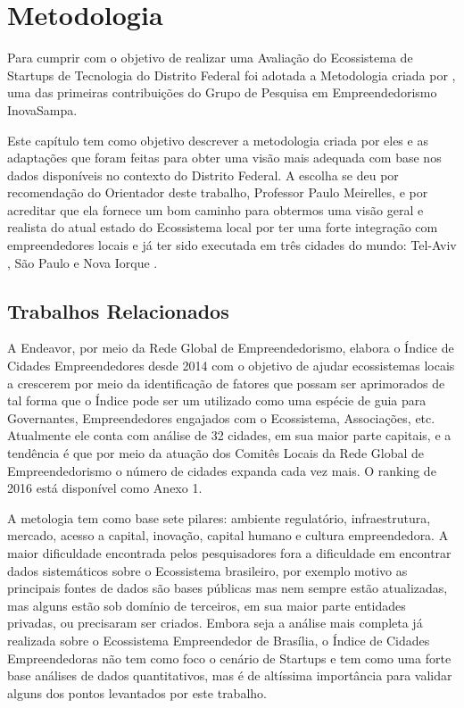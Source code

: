 \chapter[Metodologia]{Metodologia}
\label{cap-metodologia}

Para cumprir com o objetivo de realizar uma Avaliação do Ecossistema de Startups de Tecnologia do Distrito Federal foi adotada a Metodologia criada por , uma das primeiras contribuições do Grupo de Pesquisa em Empreendedorismo InovaSampa. 

Este capítulo tem como objetivo descrever a metodologia criada por eles e as adaptações que foram feitas para obter uma visão mais adequada com base nos dados disponíveis no contexto do Distrito Federal. A escolha se deu por recomendação do Orientador deste trabalho, Professor Paulo Meirelles, e por acreditar que ela fornece um bom caminho para obtermos uma visão geral e realista do atual estado do Ecossistema local por ter uma forte integração com empreendedores locais e já ter sido executada em três cidades do mundo: Tel-Aviv , São Paulo  e Nova Iorque . 

\section{Trabalhos Relacionados}
\label{section:trabalhos_relacionados}

A Endeavor, por meio da Rede Global de Empreendedorismo, elabora o Índice de Cidades Empreendedores desde 2014 com o objetivo de ajudar ecossistemas locais a crescerem por meio da identificação de fatores que possam ser aprimorados de tal forma que o Índice pode ser um utilizado como uma espécie de guia para Governantes, Empreendedores engajados com o Ecossistema, Associações, etc. Atualmente ele conta com análise de 32 cidades, em sua maior parte capitais, e a tendência é que por meio da atuação dos Comitês Locais da Rede Global de Empreendedorismo o número de cidades expanda cada vez mais. O ranking de 2016 está disponível como Anexo 1.

A metologia tem como base sete pilares: ambiente regulatório, infraestrutura, mercado, acesso a capital, inovação, capital humano e cultura empreendedora. A maior dificuldade encontrada pelos pesquisadores fora a dificuldade em encontrar dados sistemáticos sobre o Ecossistema brasileiro, por exemplo motivo as principais fontes de dados são bases públicas mas nem sempre estão atualizadas, mas alguns estão sob domínio de terceiros, em sua maior parte entidades privadas, ou precisaram ser criados. Embora seja a análise mais completa já realizada sobre o Ecossistema Empreendedor de Brasília, o Índice de Cidades Empreendedoras não tem como foco o cenário de Startups e tem como uma forte base análises de dados quantitativos, mas é de altíssima importância para validar alguns dos pontos levantados por este trabalho.

